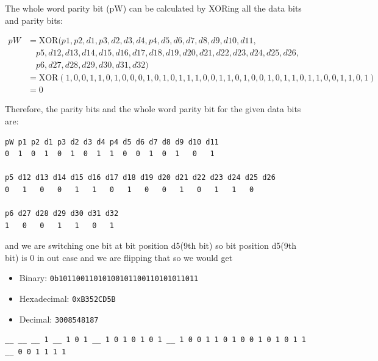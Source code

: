 \documentclass[a4paper,11pt]{article}%
\newenvironment{qanda}{\setlength{\parindent}{0pt}}{\bigskip}
\begin{document}
\begin{qanda}
	The whole word parity bit (pW) can be calculated by XORing all the data bits and parity bits:
	
	\begin{align*}
pW &= \text{XOR}(p1, p2, d1, p3, d2, d3, d4, p4, d5, d6, d7, d8, d9, d10, d11, \\
&\quad p5, d12, d13, d14, d15, d16, d17, d18, d19, d20, d21, d22, d23, d24, d25, d26, \\
&\quad p6, d27, d28, d29, d30, d31, d32) \\
&= \text{XOR}(1, 0, 0, 1, 1, 0, 1, 0, 0, 0, 1, 0, 1, 0, 1, 1, 1, 0, 0, 1, 1, 0, 1, 0, 0, 1, 0, 1, 1, 0, 1, 1, 0, 0, 1, 1, 0, 1) \\
&= 0
	\end{align*}
	
	Therefore, the parity bits and the whole word parity bit for the given data bits are:


	\begin{verbatim}
pW p1 p2 d1 p3 d2 d3 d4 p4 d5 d6 d7 d8 d9 d10 d11
0  1  0  1  0  1  0  1  1  0  0  1  0  1   0   1

p5 d12 d13 d14 d15 d16 d17 d18 d19 d20 d21 d22 d23 d24 d25 d26
0   1   0   0   1   1   0   1   0   0   1   0   1   1   0

p6 d27 d28 d29 d30 d31 d32
1   0   0   1   1   0   1
		\end{verbatim}

	and we are switching one bit at bit position d5(9th bit) so bit position d5(9th bit) is 0 in out case and we are flipping that 
	so we would get

	\begin{itemize}
	\item Binary: \texttt{0b10110011010100101100110101011011}
	\item Hexadecimal: \texttt{0xB352CD5B}
	\item Decimal: \texttt{3008548187}
	\end{itemize}
	
	
	
	\begin{verbatim}
__ __ __ 1 __ 1 0 1 __ 1 0 1 0 1 0 1 __ 1 0 0 1 1 0 1 0 0 1 0 1 0 1 1 __ 0 0 1 1 1 1
\end{verbatim}
		

\end{qanda}
\end{document}
